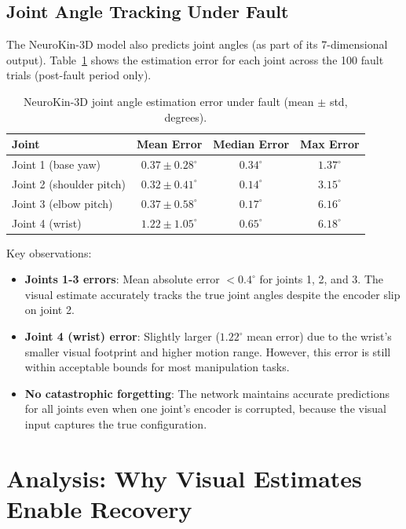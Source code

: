 \documentclass[12pt,a4paper,oneside]{report}
\begin{document}
\subsection{Joint Angle Tracking Under Fault}

The NeuroKin-3D model also predicts joint angles (as part of its 7-dimensional output). Table~\ref{tab:joint_tracking} shows the estimation error for each joint across the 100 fault trials (post-fault period only).

\begin{table}[H]
\centering
\caption{NeuroKin-3D joint angle estimation error under fault (mean $\pm$ std, degrees).}
\label{tab:joint_tracking}
\begin{tabular}{lccc}
\toprule
\textbf{Joint} & \textbf{Mean Error} & \textbf{Median Error} & \textbf{Max Error} \\
\midrule
Joint 1 (base yaw) & $0.37 \pm 0.28^\circ$ & $0.34^\circ$ & $1.37^\circ$ \\
Joint 2 (shoulder pitch) & $0.32 \pm 0.41^\circ$ & $0.14^\circ$ & $3.15^\circ$ \\
Joint 3 (elbow pitch) & $0.37 \pm 0.58^\circ$ & $0.17^\circ$ & $6.16^\circ$ \\
Joint 4 (wrist) & $1.22 \pm 1.05^\circ$ & $0.65^\circ$ & $6.18^\circ$ \\
\bottomrule
\end{tabular}
\end{table}

Key observations:
\begin{itemize}
    \item \textbf{Joints 1-3 errors}: Mean absolute error $<0.4^\circ$ for joints 1, 2, and 3. The visual estimate accurately tracks the true joint angles despite the encoder slip on joint 2.
    \item \textbf{Joint 4 (wrist) error}: Slightly larger ($1.22^\circ$ mean error) due to the wrist's smaller visual footprint and higher motion range. However, this error is still within acceptable bounds for most manipulation tasks.
    \item \textbf{No catastrophic forgetting}: The network maintains accurate predictions for all joints even when one joint's encoder is corrupted, because the visual input captures the true configuration.
\end{itemize}

\section{Analysis: Why Visual Estimates Enable Recovery}
\end{document}
